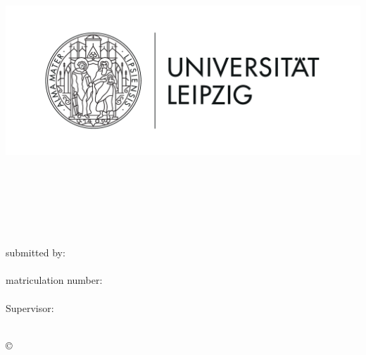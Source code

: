 \thispagestyle{plain}
\begin{titlepage}

\begin{center}
\includegraphics[height=7cm]{Bilder/Uni-L.png}\\[2.5ex]

\institut\\
\fakultaet\\
\fachgebiet\\[6ex]

\textbf{\large\titel}\\[1.5ex]
\art\\[6ex]

\normalsize
submitted by:\\
\autor\\[1.5ex]
matriculation number:\\
\matrikelnr\\[1.5ex]
Supervisor:\\
\erstbetreuer\\
\end{center}


\begin{center}
\copyright\ \jahr\\[1.0ex]
\end{center}


\end{titlepage}
